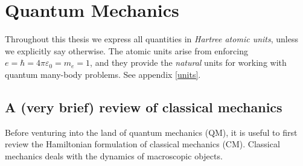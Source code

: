 \documentclass[../../master.tex]{subfiles}
\begin{document}
\iffalse  \fi
\renewcommand{\R}{{\bf R}}
\renewcommand{\r}{{\bf r}}
\newcommand{\p}{{\bf p}}
\newcommand{\q}{{\bf q}}
\renewcommand{\H}{\mathcal{H}}
\newcommand{\psit}{\left|\psi(t)\right\rangle}

\chapter{Quantum Mechanics}
Throughout this thesis we express all quantities in \emph{Hartree atomic units}, unless we explicitly say otherwise. The atomic units arise from enforcing $e=\hbar=4\pi\varepsilon_0=m_e=1$, and they provide the \emph{natural} units for working with quantum many-body problems. See appendix \ref{units}.
\section{A (very brief) review of classical mechanics}
Before venturing into the land of quantum mechanics (QM), it is useful to first review the Hamiltonian formulation of classical mechanics (CM). Classical mechanics deals with the dynamics of macroscopic objects. 
\end{document}
